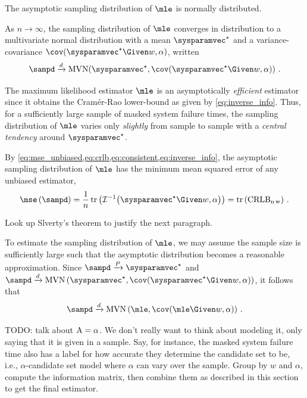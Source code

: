 \documentclass[ ../main.tex]{subfiles}
\begin{document}
The asymptotic sampling distribution of $\mle$ is normally distributed.
\begin{postulate}
\label{def:converge_in_dist}
    As $n \to \infty$, the sampling distribution of $\mle$ converges in distribution to a multivariate normal distribution with a mean $\tparam\sysparamvec$ and a variance-covariance $\cov(\tparam\sysparamvec \Given w, \alpha)$, written
    \begin{equation}
    \label{eq:converge_in_dist}
        \sampd \xrightarrow{d} \mvn\!
            \left(
                \tparam\sysparamvec, \cov(\tparam\sysparamvec \Given w, \alpha)
            \right)\,.
    \end{equation}
\end{postulate}
The maximum likelihood estimator $\mle$ is an asymptotically \emph{efficient} estimator since it obtains the Cram\'{e}r-Rao lower-bound as given by \cref{eq:inverse_info}. Thus, for a sufficiently large sample of masked system failure times, the sampling distribution of $\mle$ varies only \emph{slightly} from sample to sample with a \emph{central tendency} around $\tparam\sysparamvec$. 

By \cref{eq:mse_unbiased,eq:crlb,eq:consistent,eq:inverse_info}, the asymptotic sampling distribution of $\mle$ has the minimum mean squared error of any unbiased estimator,
\begin{equation}
\label{eq:mse_mle_trace}
\mse \left( \sampd \right) =
    \frac{1}{n} \trace \left (
        \infomatrx^{-1} \bigl(\tparam\sysparamvec \Given w, \alpha\bigr)
    \right) = \trace\left(\rm{CRLB}_{n\,w}\right)\,.
\end{equation}

\begin{remark}
Look up Slverty's theorem to justify the next paragraph.
\end{remark}
\sloppy
To estimate the sampling distribution of $\mle$, we may assume the sample size is sufficiently large such that the asymptotic distribution becomes a reasonable approximation. Since $\sampd \xrightarrow{P} \tparam\sysparamvec$ and $\sampd \xrightarrow{d} \mvn\left(\tparam\sysparamvec, \cov(\tparam\sysparamvec \Given w, \alpha)\right)$, it follows that
\begin{equation}
\sampd \xrightarrow{d} \mvn\left(\mle, \cov(\mle \Given w, \alpha)\right)\,.
\end{equation}



TODO: talk about $\mathrm{A} = \alpha$. We don't really want to think about modeling it, only saying that it is given in a sample. Say, for instance, the masked system failure time also has a label for how accurate they determine the candidate set to be, i.e., $\alpha$-candidate set model where $\alpha$ can vary over the sample. Group by $w$ and $\alpha$, compute the information matrix, then combine them as described in this section to get the final estimator.
\end{document}
